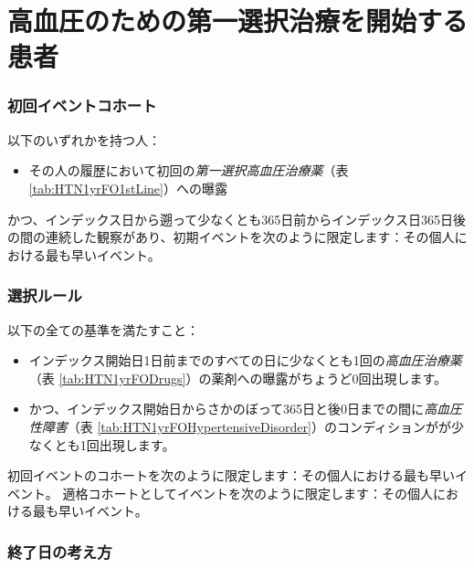 \documentclass[
  11pt]{book}
\providecommand{\tightlist}{%
  \setlength{\itemsep}{0pt}\setlength{\parskip}{0pt}}
\theoremstyle{definition}
\theoremstyle{definition}
\theoremstyle{definition}
\theoremstyle{definition}
\theoremstyle{remark}
\begin{document}
\section{高血圧のための第一選択治療を開始する患者}\label{HTN1yrFO}

\subsubsection*{初回イベントコホート}\label{ux521dux56deux30a4ux30d9ux30f3ux30c8ux30b3ux30dbux30fcux30c8-5}

以下のいずれかを持つ人：

\begin{itemize}
\tightlist
\item
  その人の履歴において初回の\emph{第一選択高血圧治療薬}（表 \ref{tab:HTN1yrFO1stLine}）への曝露
\end{itemize}

かつ、インデックス日から遡って少なくとも365日前からインデックス日365日後の間の連続した観察があり、初期イベントを次のように限定します：その個人における最も早いイベント。

\subsubsection*{選択ルール}\label{ux9078ux629eux30ebux30fcux30eb-2}

以下の全ての基準を満たすこと：

\begin{itemize}
\tightlist
\item
  インデックス開始日1日前までのすべての日に少なくとも1回の\emph{高血圧治療薬}（表 \ref{tab:HTN1yrFODrugs}）の薬剤への曝露がちょうど0回出現します。
\item
  かつ、インデックス開始日からさかのぼって365日と後0日までの間に\emph{高血圧性障害}（表 \ref{tab:HTN1yrFOHypertensiveDisorder}）のコンディションがが少なくとも1回出現します。
\end{itemize}

初回イベントのコホートを次のように限定します：その個人における最も早いイベント。 適格コホートとしてイベントを次のように限定します：その個人における最も早いイベント。

\subsubsection*{終了日の考え方}\label{ux7d42ux4e86ux65e5ux306eux8003ux3048ux65b9-5}
\end{document}
